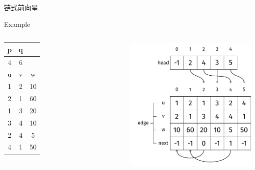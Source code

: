 \begin{frame}{链式前向星}
\begin{exampleblock}{Example}
\begin{columns}   
\begin{table}
    \begin{tabular}{ccc}
        p  & q    \\\hline
        4  & 6    \\\hline
        u  & v  &  w   \\\hline
        1  & 2  & 10   \\\hline
        2  & 1  & 60   \\\hline
        1  & 3  & 20   \\\hline
        3  & 4  & 10   \\\hline
        2  & 4  & 5    \\\hline
        4  & 1  & 50   \\\hline
    \end{tabular}
\end{table}
\includegraphics[scale=0.7]{fig/8-4.pdf}
\end{columns}
\end{exampleblock}
\end{frame}

